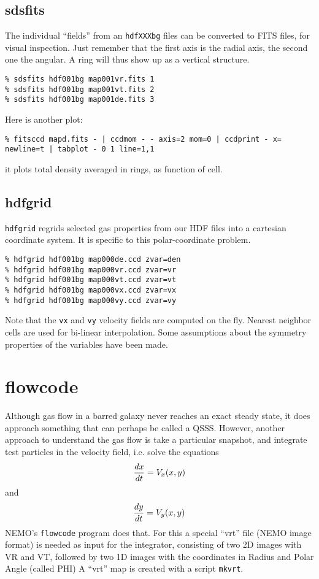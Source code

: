 \documentclass[11pt]{article}
\begin{document}
\subsection{sdsfits}

The individual ``fields'' from an {\tt hdfXXXbg} files can be converted to FITS files,
for visual inspection. Just remember that the first axis is the radial axis, the
second one the angular.  A ring will thus show up as a vertical structure.

\footnotesize\begin{verbatim}
% sdsfits hdf001bg map001vr.fits 1
% sdsfits hdf001bg map001vt.fits 2
% sdsfits hdf001bg map001de.fits 3
\end{verbatim}\normalsize

Here is another plot:
\footnotesize\begin{verbatim}
% fitsccd mapd.fits - | ccdmom - - axis=2 mom=0 | ccdprint - x= newline=t | tabplot - 0 1 line=1,1
\end{verbatim}\normalsize
it plots total density averaged in rings, as function of cell.

\subsection{hdfgrid}

{\tt hdfgrid}
regrids selected gas properties from our 
HDF files into a cartesian coordinate system. 
It is specific to this polar-coordinate problem.

\footnotesize\begin{verbatim}
% hdfgrid hdf001bg map000de.ccd zvar=den
% hdfgrid hdf001bg map000vr.ccd zvar=vr
% hdfgrid hdf001bg map000vt.ccd zvar=vt
% hdfgrid hdf001bg map000vx.ccd zvar=vx
% hdfgrid hdf001bg map000vy.ccd zvar=vy
\end{verbatim}\normalsize

Note that the {\tt vx} and {\tt vy} velocity fields
are computed on the fly. Nearest neighbor cells are
used for bi-linear interpolation. Some assumptions
about the symmetry properties of the variables
have been made.



\section{flowcode}

Although gas flow in a barred galaxy never reaches an
exact steady state, it does approach something
that can perhaps be called a QSSS. However, another approach
to understand the gas flow is take a particular snapshot, and
integrate test particles in the velocity field, i.e.
solve the equations
$$
	{dx \over dt } = V_x(x,y)
$$
and
$$
	{dy \over dt } = V_y(x,y)
$$
NEMO's {\tt flowcode} program does that. For this a special
``vrt'' file (NEMO image format) is needed as input for the
integrator, consisting
of two 2D images with VR and VT, followed by two 1D images
with the coordinates in Radius and Polar Angle (called PHI)
A ``vrt'' map is created with a script {\tt mkvrt}.
\end{document}
